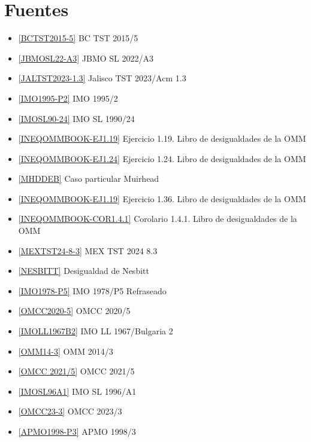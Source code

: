 \documentclass[11pt]{scrartcl}
\begin{document}
\section{Fuentes}
\begin{itemize}
    \item \ref{BCTST2015-5} BC TST 2015/5 
    \item \ref{JBMOSL22-A3} JBMO SL 2022/A3
    \item \ref{JALTST2023-1.3} Jalisco TST 2023/Acm 1.3 
    \item \ref{IMO1995-P2} IMO 1995/2
    \item \ref{IMOSL90-24} IMO SL 1990/24
    \item \ref{INEQOMMBOOK-EJ1.19} Ejercicio 1.19. Libro de desigualdades de la OMM
    \item \ref{INEQOMMBOOK-EJ1.24} Ejercicio 1.24. Libro de desigualdades de la OMM
    \item \ref{MHDDEB} Caso particular Muirhead
    \item \ref{INEQOMMBOOK-EJ1.19} Ejercicio 1.36. Libro de desigualdades de la OMM
    \item \ref{INEQOMMBOOK-COR1.4.1} Corolario 1.4.1. Libro de desigualdades de la OMM
    \item \ref{MEXTST24-8-3} MEX TST 2024 8.3
    \item \ref{NESBITT} Desigualdad de Nesbitt
    \item \ref{IMO1978-P5} IMO 1978/P5 Refraseado
    \item \ref{OMCC2020-5} OMCC 2020/5 
    \item \ref{IMOLL1967B2} IMO LL 1967/Bulgaria 2 
    \item \ref{OMM14-3} OMM 2014/3
    \item \ref{OMCC 2021/5} OMCC 2021/5
    \item \ref{IMOSL96A1} IMO SL 1996/A1
    \item \ref{OMCC23-3} OMCC 2023/3
    \item \ref{APMO1998-P3} APMO 1998/3
\end{itemize}    
\end{document}
